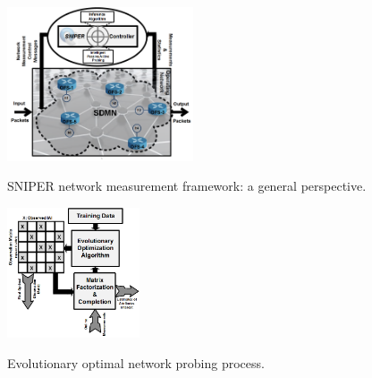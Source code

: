 \begin{figure}[t]
  \begin{center}
    {\includegraphics[keepaspectratio, width=0.49\textwidth]{GBDSNIPER_New.png}}
  \end{center}
  \caption{{SNIPER network measurement framework: a general perspective.}}
  \label{fig:GBDSNIPER}
\end{figure}
\begin{figure}[t]
  \begin{center}
    {\includegraphics[keepaspectratio, width=0.35\textwidth]{EVSmpMC.png}} \\  %
  \end{center}
  \caption{{Evolutionary optimal network probing process.}}
  \label{fig:EVSmpMC}
\end{figure}

